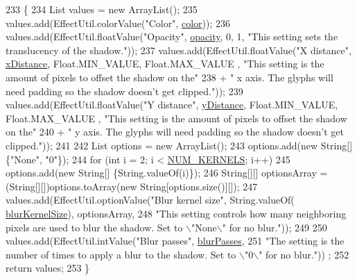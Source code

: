 \begin{DoxyCode}
233                             \{
234         List values = \textcolor{keyword}{new} ArrayList();
235         values.add(EffectUtil.colorValue(\textcolor{stringliteral}{"Color"}, \mbox{\hyperlink{classorg_1_1newdawn_1_1slick_1_1font_1_1effects_1_1_shadow_effect_a4a5a1c31b38b33b042cadabe1593bc62}{color}}));
236         values.add(EffectUtil.floatValue(\textcolor{stringliteral}{"Opacity"}, \mbox{\hyperlink{classorg_1_1newdawn_1_1slick_1_1font_1_1effects_1_1_shadow_effect_a6a03f4db2ffd55023ab5f9fde923dc0e}{opacity}}, 0, 1, \textcolor{stringliteral}{"This setting sets the
       translucency of the shadow."}));
237         values.add(EffectUtil.floatValue(\textcolor{stringliteral}{"X distance"}, \mbox{\hyperlink{classorg_1_1newdawn_1_1slick_1_1font_1_1effects_1_1_shadow_effect_a4d3581fba8877de112c8a1ec28cdf03d}{xDistance}}, Float.MIN\_VALUE, Float.MAX\_VALUE
      , \textcolor{stringliteral}{"This setting is the amount of pixels to offset the shadow on the"}
238             + \textcolor{stringliteral}{" x axis. The glyphs will need padding so the shadow doesn't get clipped."}));
239         values.add(EffectUtil.floatValue(\textcolor{stringliteral}{"Y distance"}, \mbox{\hyperlink{classorg_1_1newdawn_1_1slick_1_1font_1_1effects_1_1_shadow_effect_a06d791511d507ab313c764edbde43fa8}{yDistance}}, Float.MIN\_VALUE, Float.MAX\_VALUE
      , \textcolor{stringliteral}{"This setting is the amount of pixels to offset the shadow on the"}
240             + \textcolor{stringliteral}{" y axis. The glyphs will need padding so the shadow doesn't get clipped."}));
241 
242         List options = \textcolor{keyword}{new} ArrayList();
243         options.add(\textcolor{keyword}{new} String[] \{\textcolor{stringliteral}{"None"}, \textcolor{stringliteral}{"0"}\});
244         \textcolor{keywordflow}{for} (\textcolor{keywordtype}{int} i = 2; i < \mbox{\hyperlink{classorg_1_1newdawn_1_1slick_1_1font_1_1effects_1_1_shadow_effect_a50382c2f00212657b6a062adb899d224}{NUM\_KERNELS}}; i++)
245             options.add(\textcolor{keyword}{new} String[] \{String.valueOf(i)\});
246         String[][] optionsArray = (String[][])options.toArray(\textcolor{keyword}{new} String[options.size()][]);
247         values.add(EffectUtil.optionValue(\textcolor{stringliteral}{"Blur kernel size"}, String.valueOf(
      \mbox{\hyperlink{classorg_1_1newdawn_1_1slick_1_1font_1_1effects_1_1_shadow_effect_a9383b2ba78f68f6302bfd9e9cb5de0f0}{blurKernelSize}}), optionsArray,
248             \textcolor{stringliteral}{"This setting controls how many neighboring pixels are used to blur the shadow. Set to \(\backslash\)"None\(\backslash\)"
       for no blur."}));
249 
250         values.add(EffectUtil.intValue(\textcolor{stringliteral}{"Blur passes"}, \mbox{\hyperlink{classorg_1_1newdawn_1_1slick_1_1font_1_1effects_1_1_shadow_effect_ae7079addc56e471f5c8747ffc8397a92}{blurPasses}},
251             \textcolor{stringliteral}{"The setting is the number of times to apply a blur to the shadow. Set to \(\backslash\)"0\(\backslash\)" for no blur."}))
      ;
252         \textcolor{keywordflow}{return} values;
253     \}
\end{DoxyCode}
